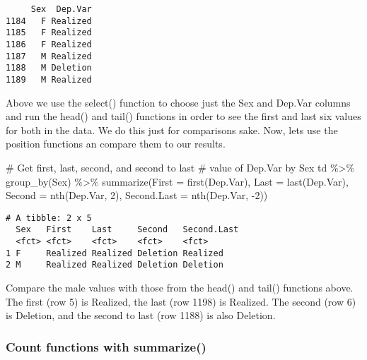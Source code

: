 \documentclass[
  12pt,
  letterpaper]{article}
\newenvironment{Shaded}{\begin{snugshade}}{\end{snugshade}}
\newcommand{\AttributeTok}[1]{\textcolor[rgb]{0.40,0.45,0.13}{#1}}
\newcommand{\CommentTok}[1]{\textcolor[rgb]{0.37,0.37,0.37}{#1}}
\newcommand{\DecValTok}[1]{\textcolor[rgb]{0.68,0.00,0.00}{#1}}
\newcommand{\FunctionTok}[1]{\textcolor[rgb]{0.28,0.35,0.67}{#1}}
\newcommand{\NormalTok}[1]{\textcolor[rgb]{0.00,0.23,0.31}{#1}}
\newcommand{\SpecialCharTok}[1]{\textcolor[rgb]{0.37,0.37,0.37}{#1}}
\renewcommand\texttt[1]{{\ttfamily\color{BrickRed}#1}}
\begin{document}
\begin{verbatim}
     Sex  Dep.Var
1184   F Realized
1185   F Realized
1186   F Realized
1187   M Realized
1188   M Deletion
1189   M Realized
\end{verbatim}

Above we use the \texttt{select()} function to choose just the
\texttt{Sex} and \texttt{Dep.Var} columns and run the \texttt{head()}
and \texttt{tail()} functions in order to see the first and last six
values for both in the data. We do this just for comparisons sake. Now,
lets use the position functions an compare them to our results.

\begin{Shaded}
\begin{Highlighting}[]
\CommentTok{\# Get first, last, second, and second to last}
\CommentTok{\# value of Dep.Var by Sex}
\NormalTok{td }\SpecialCharTok{\%\textgreater{}\%}
    \FunctionTok{group\_by}\NormalTok{(Sex) }\SpecialCharTok{\%\textgreater{}\%}
    \FunctionTok{summarize}\NormalTok{(}\AttributeTok{First =} \FunctionTok{first}\NormalTok{(Dep.Var), }\AttributeTok{Last =} \FunctionTok{last}\NormalTok{(Dep.Var),}
        \AttributeTok{Second =} \FunctionTok{nth}\NormalTok{(Dep.Var, }\DecValTok{2}\NormalTok{), }\AttributeTok{Second.Last =} \FunctionTok{nth}\NormalTok{(Dep.Var,}
            \SpecialCharTok{{-}}\DecValTok{2}\NormalTok{))}
\end{Highlighting}
\end{Shaded}

\begin{verbatim}
# A tibble: 2 x 5
  Sex   First    Last     Second   Second.Last
  <fct> <fct>    <fct>    <fct>    <fct>      
1 F     Realized Realized Deletion Realized   
2 M     Realized Realized Deletion Deletion   
\end{verbatim}

Compare the male values with those from the \texttt{head()} and
\texttt{tail()} functions above. The first (row 5) is \texttt{Realized},
the last (row 1198) is \texttt{Realized}. The second (row 6) is
\texttt{Deletion}, and the second to last (row 1188) is also
\texttt{Deletion}.

\hypertarget{count-functions-with-summarize}{%
\subsubsection{\texorpdfstring{Count functions with
\texttt{summarize()}}{Count functions with summarize()}}\label{count-functions-with-summarize}}
\end{document}
